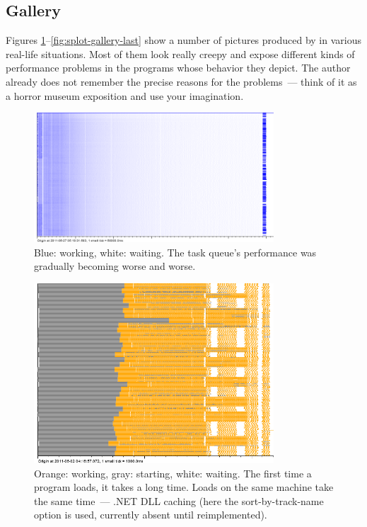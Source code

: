 \documentclass{article}
\begin{document}
\subsection{Gallery}
Figures \ref{fig:splot-gallery-first}--\ref{fig:splot-gallery-last} show a number of pictures produced by \splot{} in various real-life situations. Most of them look really creepy and expose different kinds of performance problems in the programs whose behavior they depict. The author already does not remember the precise reasons for the problems~--- think of it as a horror museum exposition and use your imagination.

\begin{figure}[p]
\center
\includegraphics[width=0.8\textwidth]{pics/splot/gradient.png}
\caption{Blue: working, white: waiting. The task queue's performance was gradually becoming worse and worse.}
\label{fig:splot-gallery-first}
\end{figure}

\begin{figure}[p]
\center
\includegraphics[width=0.8\textwidth]{pics/splot/creepy-startup.png}
\caption{Orange: working, gray: starting, white: waiting. The first time a program loads, it takes a long time. Loads on the same machine take the same time~--- .NET DLL caching (here the sort-by-track-name option is used, currently absent until reimplemented).}
\end{figure}
\end{document}

